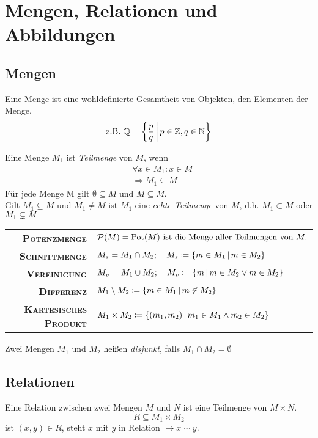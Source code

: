 \chapter{Mengen, Relationen und Abbildungen}

\section{Mengen}
Eine Menge ist eine wohldefinierte Gesamtheit von Objekten, den Elementen der Menge.
\begin{equation*}
  \text{z.B. }\mathbb{Q}=\left\{ \frac{p}{q} \,\middle|\, p\in\mathbb{Z}, q\in\mathbb{N} \right\}
\end{equation*}

Eine Menge $M_1$ ist \emph{Teilmenge} von $M$, wenn
\begin{align*}
  &\forall x\in M_1 : x\in M\\
  &\Rightarrow M_1 \subseteq M
\end{align*}
Für jede Menge M gilt $\emptyset \subseteq M$ und $M\subseteq M$.\\
Gilt $M_1\subseteq M$ und $M_1\neq M$ ist $M_1$ eine \emph{echte Teilmenge} von $M$, d.h. $M_1 \subset M$ oder $M_1\subsetneq M$

\medskip
\renewcommand{\arraystretch}{1.4}
\begin{tabular}{>{\bfseries\scshape}r l}
	Potenzmenge & $\mathcal{P}(M)=\mathrm{Pot}(M) \text{ ist die Menge aller Teilmengen von } M.$\\
	Schnittmenge & $M_s = M_1 \cap M_2; \quad M_s \coloneqq \left\{ m\in M_1 \,\middle|\, m\in M_2 \right\}$\\
	Vereinigung & $M_v = M_1 \cup M_2; \quad M_v \coloneqq \left\{ m \,\middle|\, m\in M_2 \vee m\in M_2 \right\}$\\
	Differenz & $M_1\setminus M_2 \coloneqq \left\{ m\in M_1 \,\middle|\, m\not\in M_2 \right\}$\\
	Kartesisches Produkt & $M_1 \times M_2 \coloneqq \left\{ (m_1, m_2) \,\middle|\, m_1\in M_1 \wedge m_2\in M_2 \right\}$
\end{tabular}
\medskip

Zwei Mengen $M_1$ und $M_2$ heißen \emph{disjunkt}, falls $M_1\cap M_2 = \emptyset$

\section{Relationen}
Eine Relation zwischen zwei Mengen $M$ und $N$ ist eine Teilmenge von $M\times N$.
\begin{equation*}
  R\subseteq M_1\times M_2
\end{equation*}
ist $(x, y) \in R$, steht $x$ mit $y$ in Relation $\rightarrow x\sim y$.

